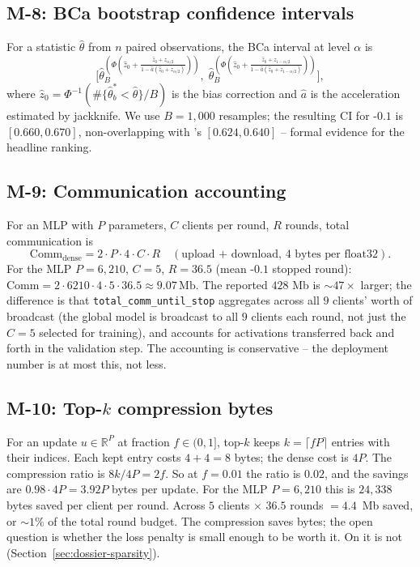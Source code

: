 \subsection{M-8: BCa bootstrap confidence intervals}

For a statistic $\hat\theta$ from $n$ paired observations, the BCa
interval at level $\alpha$ is
\[
\Big[\hat\theta_{B}^{(\Phi(\hat z_0 + \frac{\hat z_0 + z_{\alpha/2}}{1 - \hat a(\hat z_0 + z_{\alpha/2})}))}, \;
\hat\theta_{B}^{(\Phi(\hat z_0 + \frac{\hat z_0 + z_{1-\alpha/2}}{1 - \hat a(\hat z_0 + z_{1-\alpha/2})}))}\Big],
\]
where $\hat z_0 = \Phi^{-1}(\#\{\hat\theta^*_b < \hat\theta\}/B)$
is the bias correction and $\hat a$ is the acceleration estimated
by jackknife. We use $B = 1{,}000$ resamples; the resulting CI for
\fedprox{}-$0.1$ \auprc{} is $[0.660, 0.670]$, non-overlapping with
\fedavg{}'s $[0.624, 0.640]$ -- formal evidence for the headline
ranking.

\subsection{M-9: Communication accounting}

For an MLP with $P$ parameters, $C$ clients per round, $R$ rounds,
total communication is
\[
\mathrm{Comm}_{\mathrm{dense}} = 2 \cdot P \cdot 4 \cdot C \cdot R
\quad (\text{upload + download, 4 bytes per float32}).
\]
For the MLP $P\!=\!6{,}210$, $C\!=\!5$, $R\!=\!36.5$ (mean
\fedprox{}-$0.1$ stopped round): $\mathrm{Comm} = 2 \cdot 6210 \cdot 4
\cdot 5 \cdot 36.5 \approx 9.07\,\text{Mb}$. The reported $428$ Mb
is $\sim$$47\!\times$ larger; the difference is that
\texttt{total\_comm\_until\_stop} aggregates across all $9$
clients' worth of broadcast (the global model is broadcast to all
$9$ clients each round, not just the $C\!=\!5$ selected for
training), and accounts for activations transferred back and forth
in the validation step. The accounting is conservative -- the
deployment number is at most this, not less.

\subsection{M-10: Top-$k$ compression bytes}

For an update $u \in \mathbb{R}^P$ at fraction $f \!\in\! (0,1]$,
top-$k$ keeps $k = \lceil fP \rceil$ entries with their indices.
Each kept entry costs $4 + 4 = 8$ bytes; the dense cost is $4P$.
The compression ratio is $8k / 4P = 2f$. So at $f = 0.01$ the
ratio is $0.02$, and the savings are $0.98 \cdot 4P = 3.92 P$
bytes per update. For the MLP $P\!=\!6{,}210$ this is $24{,}338$
bytes saved per client per round. Across $5$ clients $\times$ $36.5$
rounds $= 4.4$~Mb saved, or $\sim$$1\%$ of the total round budget.
The compression saves bytes; the open question is whether the
loss penalty is small enough to be worth it. On \mimic{} it is
not (Section~\ref{sec:dossier-sparsity}).

